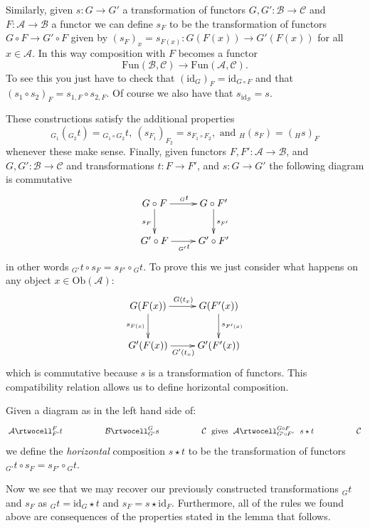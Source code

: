 \medskip\noindent
Similarly, given $s : G \to G'$ a transformation of
functors $G, G' : \mathcal{B} \to \mathcal{C}$ and
$F : \mathcal{A} \to \mathcal{B}$ a functor we can define
$s_F$ to be the transformation of functors
$G\circ F \to G' \circ F$ given by
$(s_F)_x = s_{F(x)} : G(F(x)) \to G'(F(x))$
for all $x \in \mathcal{A}$. In this way
composition with $F$ becomes a functor
$$
\text{Fun}(\mathcal{B}, \mathcal{C})
\longrightarrow
\text{Fun}(\mathcal{A}, \mathcal{C}).
$$
To see this you just have to check that
$(\text{id}_G)_F = \text{id}_{G\circ F}$ and that
$(s_1 \circ s_2)_F = s_{1, F} \circ s_{2, F}$.
Of course we also have that $s_{\text{id}_{\mathcal{B}}} = s$.

\medskip\noindent
These constructions satisfy the additional properties
$$
{}_{G_1}({}_{G_2}t) = {}_{G_1\circ G_2}t, \ 
(s_{F_1})_{F_2} = s_{F_1 \circ F_2}, \text{ and }
{}_H(s_F) = ({}_Hs)_F
$$
whenever these make sense.
Finally, given functors $F, F' : \mathcal{A} \to \mathcal{B}$,
and $G, G' : \mathcal{B} \to \mathcal{C}$ and transformations
$t : F \to F'$, and $s : G \to G'$ the following
diagram is commutative
$$
\xymatrix{
G \circ F \ar[r]^{{}_Gt} \ar[d]_{s_F}
&
G \circ F' \ar[d]^{s_{F'}} \\
G' \circ F \ar[r]_{{}_{G'}t}
&
G' \circ F'
}
$$
in other words ${}_{G'}t \circ s_F =  s_{F'}\circ {}_Gt$.
To prove this we just consider what happens on
any object $x \in \text{Ob}(\mathcal{A})$:
$$
\xymatrix{
G(F(x)) \ar[r]^{G(t_{x})} \ar[d]_{s_{F(x)}}
&
G(F'(x)) \ar[d]^{s_{F'(x)}} \\
G'(F(x)) \ar[r]_{G'(t_{x})}
&
G'(F'(x))
}
$$
which is commutative because $s$ is a transformation
of functors. This compatibility relation allows us
to define horizontal composition.

\begin{definition}
\label{definition-horizontal-composition}
Given a diagram as in the left hand side of:
$$
\xymatrixcolsep{4pc}
\xymatrix{
\mathcal{A}
\rtwocell^F_{F'}{t}
&
\mathcal{B}
\rtwocell^G_{G'}{s}
&
\mathcal{C}
}
\text{ gives }
\xymatrix{
\mathcal{A}
\rtwocell^{G \circ F} _{G' \circ F'}{\ \ s \star t}
&
\mathcal{C}
}
$$
we define the {\it horizontal} composition $s \star t$ to be the
transformation of functors ${}_{G'}t \circ s_F =  s_{F'}\circ {}_Gt$.
\end{definition}

\noindent
Now we see that we may recover our previously constructed
transformations ${}_Gt$ and $s_F$ as
$ {}_Gt = \text{id}_G \star t $ and $ s_F = s \star \text{id}_F $.
Furthermore, all of the rules we found above are consequences of
the properties stated in the lemma that follows.

